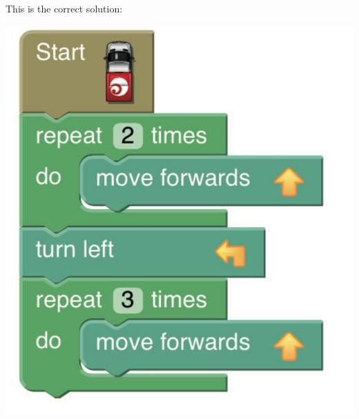 \documentclass{../../../lessonplan}
\begin{document}
\begin{lessonplan}
This is the correct solution:

\includegraphics[width=.5\linewidth]{solution.jpg}

\end{lessonplan}
\end{document}
